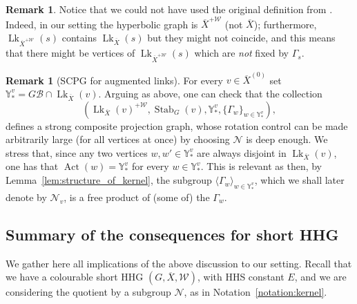 \documentclass[svgnames]{amsart}
\theoremstyle{plain}
\theoremstyle{definition}
\newtheorem{rem}[thm]{Remark}
\newcommand{\ov}[1]{\overline{#1}}
\newcommand{\link}{\operatorname{Lk}}
\newcommand{\Stab}[2]{\operatorname{Stab}_{#1}(#2)}
\newcommand{\Act}{\operatorname{Act}}
\newcommand{\N}{\mathcal{N}}
\newcommand{\B}{\mathcal{B}}
\newcommand{\W}{\mathcal{W}}
\begin{document}
\begin{rem}\label{rem:why_not_dfdt}
Notice that we could not have used the original definition from \cite{dfdt}. Indeed, in our setting the hyperbolic graph is $\ov X^{+\W}$ (not $\ov X$); furthermore, $\link_{\ov X^{+\W}}(s)$ contains $\link_{\ov X}(s)$ but they might not coincide, and this means that there might be vertices of $\link_{\ov X^{+\W}}(s)$ which are \emph{not} fixed by $\Gamma_s$. \end{rem}



\begin{rem}[SCPG for augmented links]\label{rem:scpg_local_version}
For every $v\in\ov{X}^{(0)}$ set $\mathbb{Y}^v_*=G\B \cap \link_{\ov X}(v)$. Arguing as above, one can check that the collection $$\left(\link_{\ov X}(v)^{+\W}, \Stab{G}{v}, \mathbb{Y}^v_*,  \{\Gamma_w\}_{w\in \mathbb{Y}^v_*}\right),$$ defines a strong composite projection graph, whose rotation control can be made arbitrarily large (for all vertices at once) by choosing $\N$ is deep enough. We stress that, since any two vertices $w,w'\in \mathbb{Y}^v_*$ are always disjoint in $\link_{\ov X}(v)$, one has that $\Act(w)=\mathbb{Y}^v_*$ for every $w\in \mathbb{Y}^v_*$. This is relevant as then, by Lemma~\ref{lem:structure_of_kernel}, the subgroup $\langle \Gamma_w\rangle _{w\in \mathbb{Y}^v_*}$, which we shall later denote by $\N_v$, is a free product of (some of) the $\Gamma_w$.
\end{rem}






\subsection{Summary of the consequences for short HHG}\label{subsec:rotating_for_short}
We gather here all implications of the above discussion to our setting. Recall that we have a colourable short HHG $(G, \ov X, \W)$, with HHS constant $E$, and we are considering the quotient by a subgroup $\N$, as in Notation~\ref{notation:kernel}. 
\end{document}
